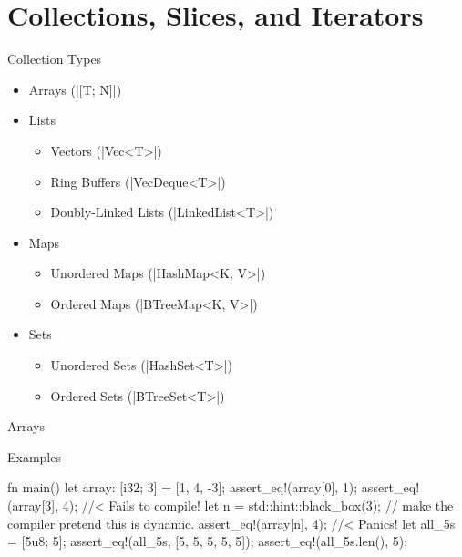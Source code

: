 \documentclass[8pt, aspectratio=169]{beamer}
\begin{document}
{\section{Collections, Slices, and Iterators}

\begin{frame}{Collection Types}
\begin{itemize}
\item Arrays (\rustinline|[T; N]|)
\item Lists
\begin{itemize}
\item Vectors (\rustinline|Vec<T>|)
\item Ring Buffers (\rustinline|VecDeque<T>|)
\item Doubly-Linked Lists (\rustinline|LinkedList<T>|)
\end{itemize}
\item Maps
\begin{itemize}
\item Unordered Maps (\rustinline|HashMap<K, V>|)
\item Ordered Maps (\rustinline|BTreeMap<K, V>|)	
\end{itemize}
\item Sets
\begin{itemize}
\item Unordered Sets (\rustinline|HashSet<T>|)
\item Ordered Sets (\rustinline|BTreeSet<T>|)	
\end{itemize}
\end{itemize}
\end{frame}

\begin{frame}[fragile]{Arrays}
\begin{exampleblock}{Examples}
\begin{rustcode}
fn main() {
    let array: [i32; 3] = [1, 4, -3];
    assert_eq!(array[0], 1);
    assert_eq!(array[3], 4);         //< Fails to compile!
    let n = std::hint::black_box(3); // make the compiler pretend this is dynamic.
    assert_eq!(array[n], 4);         //< Panics!
    let all_5s = [5u8; 5];
    assert_eq!(all_5s, [5, 5, 5, 5, 5]);
    assert_eq!(all_5s.len(), 5);
}
\end{rustcode}
\end{exampleblock}
\end{frame}

}
\end{document}
